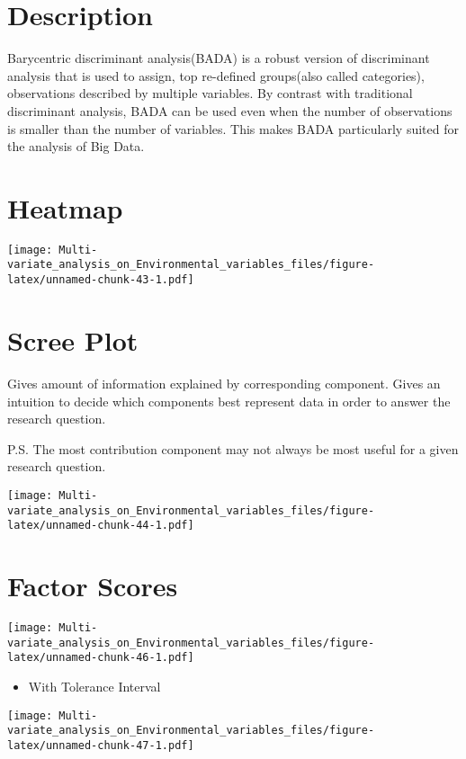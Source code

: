 \documentclass[]{book}
\providecommand{\tightlist}{%
  \setlength{\itemsep}{0pt}\setlength{\parskip}{0pt}}
\begin{document}
\hypertarget{description-2}{%
\section{Description}\label{description-2}}

Barycentric discriminant analysis(BADA) is a robust version of
discriminant analysis that is used to assign, top re-deﬁned groups(also
called categories), observations described by multiple variables. By
contrast with traditional discriminant analysis, BADA can be used even
when the number of observations is smaller than the number of variables.
This makes BADA particularly suited for the analysis of Big Data.

\hypertarget{heatmap-1}{%
\section{Heatmap}\label{heatmap-1}}

\texttt{[image: Multi-variate\_analysis\_on\_Environmental\_variables\_files/figure-latex/unnamed-chunk-43-1.pdf]}

\hypertarget{scree-plot-2}{%
\section{Scree Plot}\label{scree-plot-2}}

Gives amount of information explained by corresponding component. Gives
an intuition to decide which components best represent data in order to
answer the research question.

P.S. The most contribution component may not always be most useful for a
given research question.

\texttt{[image: Multi-variate\_analysis\_on\_Environmental\_variables\_files/figure-latex/unnamed-chunk-44-1.pdf]}

\hypertarget{factor-scores-2}{%
\section{Factor Scores}\label{factor-scores-2}}

\texttt{[image: Multi-variate\_analysis\_on\_Environmental\_variables\_files/figure-latex/unnamed-chunk-46-1.pdf]}

\begin{itemize}
\tightlist
\item
  With Tolerance Interval
\end{itemize}

\texttt{[image: Multi-variate\_analysis\_on\_Environmental\_variables\_files/figure-latex/unnamed-chunk-47-1.pdf]}
\end{document}

